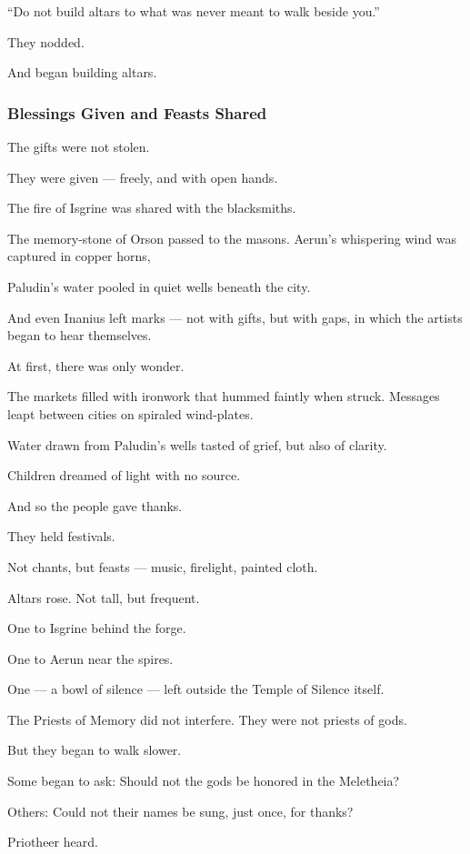 \documentclass[12pt]{article}
\begin{document}
“Do not build altars to what was never meant to walk beside you.”

They nodded.

And began building altars.


\dotfill

\subsubsection{Blessings Given and Feasts Shared}

The gifts were not stolen.  

They were given — freely, and with open hands.

The fire of Isgrine was shared with the blacksmiths.  

The memory-stone of Orson passed to the masons.  
Aerun’s whispering wind was captured in copper horns,  

Paludin’s water pooled in quiet wells beneath the city.  

And even Inanius left marks —  
not with gifts, but with gaps,  
in which the artists began to hear themselves.

At first, there was only wonder.

The markets filled with ironwork that hummed faintly when struck.  
Messages leapt between cities on spiraled wind-plates.  

Water drawn from Paludin’s wells tasted of grief, but also of clarity.  

Children dreamed of light with no source.

And so the people gave thanks.

They held festivals. 

Not chants, but feasts — music, firelight, painted cloth.

Altars rose. Not tall, but frequent.

One to Isgrine behind the forge.  

One to Aerun near the spires.  

One — a bowl of silence — left outside the Temple of Silence itself.

The Priests of Memory did not interfere.  
They were not priests of gods.

But they began to walk slower.

Some began to ask:  
Should not the gods be honored in the Meletheia?

Others:  
Could not their names be sung, just once, for thanks?

Priotheer heard.
\end{document}
